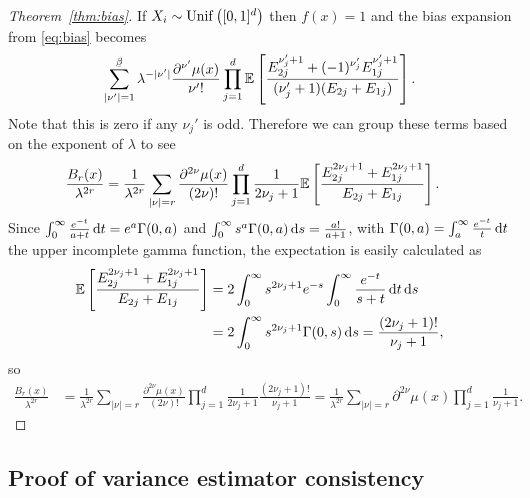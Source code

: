 \begin{proof}[Theorem~\ref{thm:bias}]
  If $X_i \sim \operatorname{Unif}\big([0,1]^d\big)$ then $f(x) = 1$ and
  the bias expansion from \eqref{eq:bias} becomes
  \begin{align*}
    \sum_{|\nu'|=1}^{\flbeta}
    \lambda^{- |\nu'|}
    \frac{\partial^{\nu'} \mu(x)}{\nu' !}
    \prod_{j=1}^d
    \E \left[
      \frac{E_{2j}^{\nu'_j + 1}
      + (-1)^{\nu'_j} E_{1j}^{\nu'_j + 1}}
      {(\nu'_j + 1) (E_{2j} + E_{1j})}
    \right].
  \end{align*}
  Note that this is zero if any $\nu_j'$ is odd.
  Therefore we can group these terms based on the exponent of $\lambda$ to see
  \begin{align*}
    \frac{B_r(x)}{\lambda^{2r}}
    &=
    \frac{1}{\lambda^{2r}}
    \sum_{|\nu|=r}
    \frac{\partial^{2 \nu} \mu(x)}{(2 \nu) !}
    \prod_{j=1}^d
    \frac{1}{2\nu_j + 1}
    \mathbb{E} \left[
      \frac{E_{2j}^{2\nu_j + 1} + E_{1j}^{2\nu_j + 1}}
      {E_{2j} + E_{1j}}
    \right].
  \end{align*}
  Since $\int_0^\infty \frac{e^{-t}}{a+t} \,\mathrm{d}t = e^a \Gamma(0,a)$
  and $\int_0^\infty s^a \Gamma(0, a) \,\mathrm{d}s = \frac{a!}{a+1}$,
  with $\Gamma(0, a) = \int_a^\infty \frac{e^{-t}}{t} \,\mathrm{d}t$
  the upper incomplete gamma function,
  the expectation is easily calculated as
  \begin{align*}
    \mathbb{E} \left[
      \frac{E_{2j}^{2\nu_j + 1} + E_{1j}^{2\nu_j + 1}}
      {E_{2j} + E_{1j}}
    \right]
    &=
    2
    \int_{0}^{\infty}
    s^{2\nu_j + 1}
    e^{-s}
    \int_{0}^{\infty}
    \frac{e^{-t}}
    {s + t}
    \,\mathrm{d}t
    \,\mathrm{d}s \\
    &=
    2 \int_{0}^{\infty}
    s^{2\nu_j + 1}
    \Gamma(0, s)
    \,\mathrm{d}s
    =
    \frac{(2 \nu_j + 1)!}{\nu_j + 1},
  \end{align*}
  so
  \begin{align*}
    \frac{B_r(x)}{\lambda^{2r}}
    &=
    \frac{1}{\lambda^{2r}}
    \sum_{|\nu|=r}
    \frac{\partial^{2 \nu} \mu(x)}{(2 \nu) !}
    \prod_{j=1}^d
    \frac{1}{2\nu_j + 1}
    \frac{(2 \nu_j + 1)!}{\nu_j + 1}
    =
    \frac{1}{\lambda^{2r}}
    \sum_{|\nu|=r}
    \partial^{2 \nu} \mu(x)
    \prod_{j=1}^d
    \frac{1}{\nu_j + 1}.
  \end{align*}
\end{proof}

\subsection*{Proof of variance estimator consistency}

